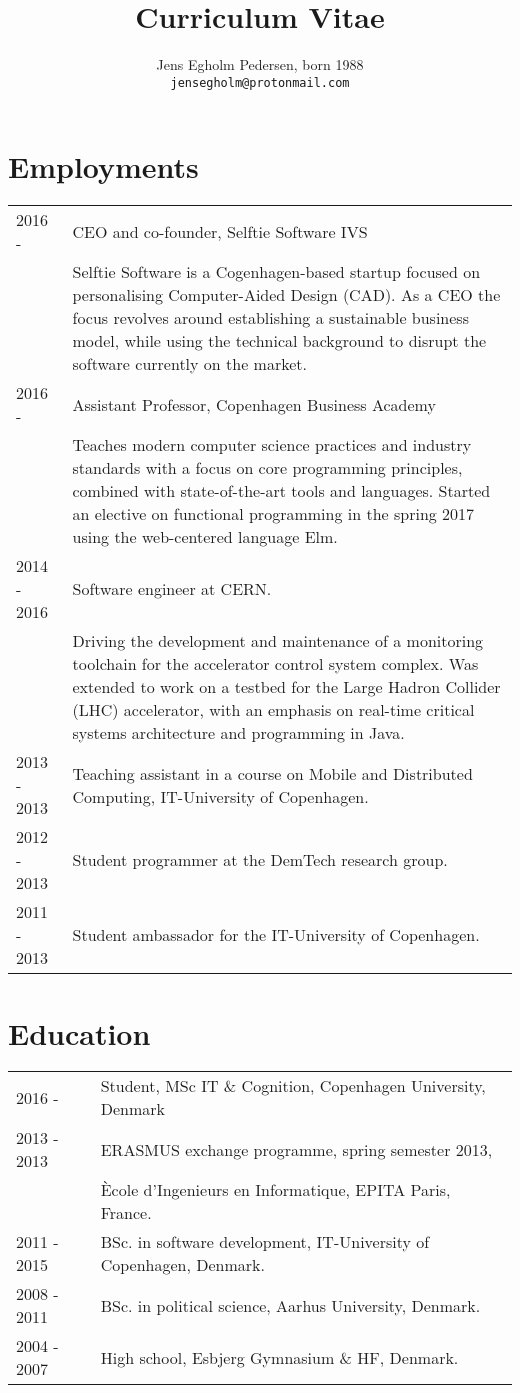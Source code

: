 \documentclass[12pt,a4paper,notitlepage]{article}
\author{Jens Egholm Pedersen, born 1988
\\ \texttt{jensegholm@protonmail.com}
}
\title{Curriculum Vitae}
\begin{document}
\maketitle

\section*{Employments}
\begin{tabularx}{\textwidth}{l X}
2016 -      & CEO and co-founder, Selftie Software IVS \\
            & Selftie Software is a Cogenhagen-based startup focused on personalising
Computer-Aided Design (CAD). As a CEO the focus revolves around establishing a
sustainable business model, while using the technical background to disrupt
the software currently on the market.\\
2016 -      & Assistant Professor, Copenhagen Business Academy \\
            & Teaches modern computer science practices and industry standards
with a focus on core programming principles, combined with
state-of-the-art tools and languages. Started an elective on functional
programming in the spring 2017 using the web-centered language Elm.\\
2014 - 2016 & Software engineer at CERN. \\
            & Driving the development and maintenance of
a monitoring toolchain for the accelerator control system complex.
Was extended to work on a testbed for the Large Hadron Collider (LHC)
accelerator, with an emphasis on real-time critical systems architecture and
programming in Java.\\
2013 - 2013 & Teaching assistant in a course on Mobile and Distributed Computing, IT-University of Copenhagen. \\
2012 - 2013 & Student programmer at the DemTech research group. \\
2011 - 2013 & Student ambassador for the IT-University of Copenhagen.
\end{tabularx}

\section*{Education}
\begin{tabularx}{\textwidth}{l X}
  2016 - & Student, MSc IT \& Cognition, Copenhagen University, Denmark \\
2013 - 2013 & ERASMUS exchange programme, spring semester 2013, \\
            & Ècole d'Ingenieurs en Informatique, EPITA Paris, France. \\
2011 - 2015 & BSc. in software development, IT-University of Copenhagen, Denmark. \\
2008 - 2011 & BSc. in political science, Aarhus University, Denmark. \\
2004 - 2007 & High school, Esbjerg Gymnasium \& HF, Denmark.
\end{tabularx}
\end{document}
